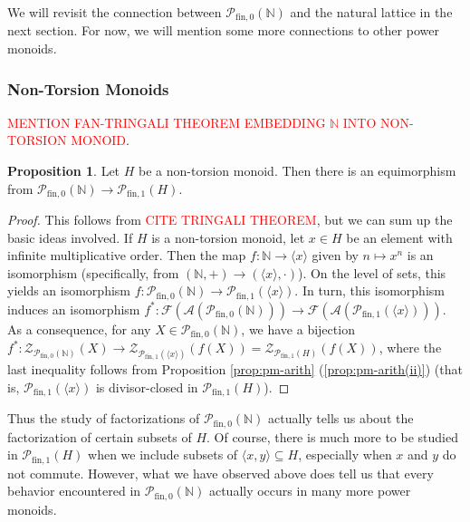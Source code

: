 \documentclass{report}
\newcommand{\A}{\mathscr{A}}
\newcommand{\F}{\mathscr{F}}
\newcommand{\NN}{\mathbb{N}}
\renewcommand{\P}{\mathcal{P}}
\newcommand{\Z}{\mathcal{Z}}
\newcommand{\gen}[1]{\langle #1 \rangle}
\newcommand{\fin}{\textrm{fin}}
\newcommand{\fun}{{\textrm{fin}, 1}}
\renewcommand{\:}{\text{:}}
\newcommand{\PN}{{\P_{\fin,0}(\NN)}}
\theoremstyle{definition}
\newtheorem{prop}[defn]{Proposition}
\begin{document}
We will revisit the connection between $\PN$ and the natural lattice in the next section.
For now, we will mention some more connections to other power monoids.



\subsubsection*{Non-Torsion Monoids}

\textcolor{red}{MENTION FAN-TRINGALI THEOREM EMBEDDING $\NN$ INTO NON-TORSION MONOID}.
	
\begin{prop}\label{prop:natural-to-non-tors}
Let $H$ be a non-torsion monoid.
Then there is an equimorphism from $\PN \to \P_\fun(H)$.
\end{prop}
\begin{proof}
This follows from \textcolor{red}{CITE TRINGALI THEOREM}, but we can sum up the basic ideas involved.  
If $H$ is a non-torsion monoid, let $x\in H$ be an element with infinite multiplicative order.  
Then the map $f: \NN \to \gen{x}$ given by $n\mapsto x^n$ is an isomorphism (specifically, from $(\NN,+)\to (\gen{x},\cdot)$).
On the level of sets, this yields an isomorphism $f: \PN \to \P_\fun(\gen{x})$.
In turn, this isomorphism induces an isomorphism $f^*: \F(\A(\PN)) \to \F(\A(\P_\fun(\gen{x})))$.
As a consequence, for any $X \in \PN$, we have a bijection $f^*: \Z_{\PN}(X) \to \Z_{\P_\fun(\gen{x})}(f(X)) = \Z_{\P_\fun(H)}(f(X))$, where the last inequality follows from Proposition \ref{prop:pm-arith} (\ref{prop:pm-arith(ii)}) (that is, $\P_\fun(\gen{x})$ is divisor-closed in $\P_\fun(H)$).
\end{proof}

Thus the study of factorizations of $\PN$ actually tells us about the factorization of certain subsets of $H$.
Of course, there is much more to be studied in $\P_\fun(H)$ when we include subsets of $\gen{x,y}\subseteq H$, especially when $x$ and $y$ do not commute.
However, what we have observed above does tell us that every behavior encountered in $\PN$ actually occurs in many more power monoids.
\end{document}
